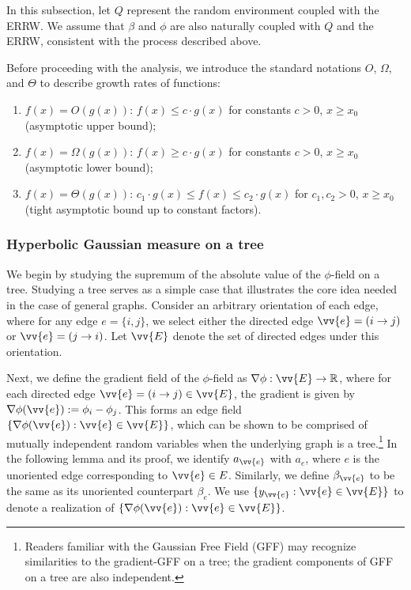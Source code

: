 \documentclass[a4paper, 11pt]{article}
\begin{document}
In this subsection, let \( Q \) represent the random environment coupled with the ERRW. We assume that \( \beta \) and \( \phi \) are also naturally coupled with \( Q \) and the ERRW, consistent with the process described above.

Before proceeding with the analysis, we introduce the standard notations 
\(O\), \(\Omega\), and \(\Theta\) to describe growth rates of functions:
\begin{enumerate}
    \item \(f(x) = O(g(x))\): \(f(x) \leq c \cdot g(x)\) for constants \(c > 0\), \(x \geq x_0\) (asymptotic upper bound);
    \item \(f(x) = \Omega(g(x))\): \(f(x) \geq c \cdot g(x)\) for constants \(c > 0\), \(x \geq x_0\) (asymptotic lower bound);
    \item \(f(x) = \Theta(g(x))\): \(c_1 \cdot g(x) \leq f(x) \leq c_2 \cdot g(x)\) for \(c_1, c_2 > 0\), \(x \geq x_0\) (tight asymptotic bound up to constant factors).
\end{enumerate}


\subsubsection{Hyperbolic Gaussian measure on a tree}

We begin by 
studying the supremum of the absolute value
of the $\phi$-field on a tree.
Studying a tree serves as a simple case that illustrates the core idea needed in the case of general graphs.
Consider an arbitrary orientation of each edge, where for any edge $e = \{i,j\}$, we select either the directed edge $\vv{e} = (i \to j)$ or $\vv{e} = (j \to i)$. Let $\vv{E}$ denote the set of directed edges under this orientation.  

Next, we define the gradient field of the $\phi$-field as $\nabla \phi: \vv{E} \to \mathbb{R}$, where for each directed edge $\vv{e} = (i \to j) \in \vv{E}$, the gradient is given by $\nabla \phi(\vv{e}) := \phi_i - \phi_j$. This forms an edge field $\{ \nabla \phi(\vv{e}) : \vv{e} \in \vv{E} \}$, which can be shown to be comprised of mutually independent random variables when the underlying graph is a tree.\footnote{Readers familiar with the Gaussian Free Field (GFF) may recognize similarities to the gradient-GFF on a tree; the gradient components of GFF on a tree are also independent.} In the following lemma and its proof, we identify $a_{\vv{e}}$ with $a_e$, where $e$ is the unoriented edge corresponding to $\vv{e}\in E$. Similarly, we define $\beta_{\vv{e}}$ to be the same as its unoriented counterpart $\beta_e$. We use $\{y_{\vv{e}} : \vv{e}\in \vv{E}\}$ to denote a realization of $\{ \nabla \phi(\vv{e}) : \vv{e} \in \vv{E} \}$.
\end{document}
